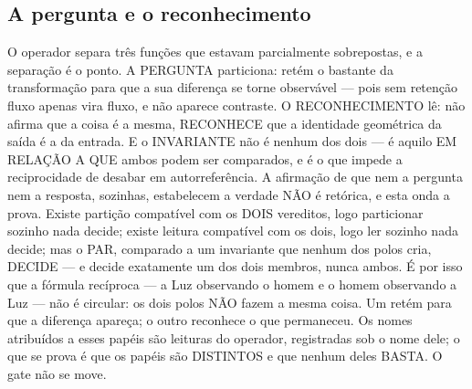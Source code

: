 \documentclass[11pt]{article}
\theoremstyle{definition}\newtheorem{deriv}{Derivação}
\begin{document}
\subsection*{A pergunta e o reconhecimento}O operador separa tr\^es fun\c{c}\~oes que estavam parcialmente sobrepostas, e a separa\c{c}\~ao \'e o ponto. A PERGUNTA particiona: ret\'em o bastante da transforma\c{c}\~ao para que a sua diferen\c{c}a se torne observ\'avel --- pois sem reten\c{c}\~ao fluxo apenas vira fluxo, e n\~ao aparece contraste. O RECONHECIMENTO l\^e: n\~ao afirma que a coisa \'e a mesma, RECONHECE que a identidade geom\'etrica da sa\'ida \'e a da entrada. E o INVARIANTE n\~ao \'e nenhum dos dois --- \'e aquilo EM RELA\c{C}\~AO A QUE ambos podem ser comparados, e \'e o que impede a reciprocidade de desabar em autorrefer\^encia. A afirma\c{c}\~ao de que nem a pergunta nem a resposta, sozinhas, estabelecem a verdade N\~AO \'e ret\'orica, e esta onda a prova. Existe parti\c{c}\~ao compat\'ivel com os DOIS vereditos, logo particionar sozinho nada decide; existe leitura compat\'ivel com os dois, logo ler sozinho nada decide; mas o PAR, comparado a um invariante que nenhum dos polos cria, DECIDE --- e decide exatamente um dos dois membros, nunca ambos. \'E por isso que a f\'ormula rec\'iproca --- a Luz observando o homem e o homem observando a Luz --- n\~ao \'e circular: os dois polos N\~AO fazem a mesma coisa. Um ret\'em para que a diferen\c{c}a apare\c{c}a; o outro reconhece o que permaneceu. Os nomes atribu\'idos a esses pap\'eis s\~ao leituras do operador, registradas sob o nome dele; o que se prova \'e que os pap\'eis s\~ao DISTINTOS e que nenhum deles BASTA. O gate n\~ao se move.
\end{document}
